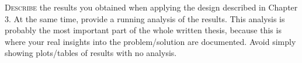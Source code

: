 \lettrine{D}{escribe} the results you obtained when applying the design described in Chapter 3.
At the same time, provide a running analysis of the results. This analysis is probably
the most important part of the whole written thesis, because this is where your real
insights into the problem/solution are documented. Avoid simply showing
plots/tables of results with no analysis.

